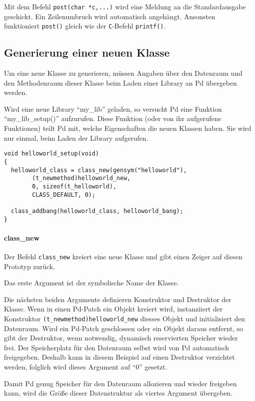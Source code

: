 \documentclass[12pt, a4paper,austrian, titlepage]{article}
\begin{document}
Mit dem Befehl \verb+post(char *c,...)+ wird eine Meldung an die Standardausgabe
geschickt.
Ein Zeilenumbruch wird automatisch angehängt.
Ansonsten funktioniert \verb+post()+ gleich wie der {\tt C}-Befehl \verb+printf()+.

\subsection{Generierung einer neuen Klasse}
Um eine neue Klasse zu generieren, müssen Angaben über
den Datenraum und den Methodenraum dieser Klasse 
beim Laden einer Library an Pd übergeben werden.

Wird eine neue Library ``my\_lib'' geladen,
so versucht Pd eine Funktion ``my\_lib\_setup()'' aufzurufen.
Diese Funktion (oder von ihr aufgerufene Funktionen) teilt Pd mit,
welche Eigenschaften die neuen Klassen haben.
Sie wird nur einmal, beim Laden der Library aufgerufen.

\begin{verbatim}
void helloworld_setup(void)
{
  helloworld_class = class_new(gensym("helloworld"),
        (t_newmethod)helloworld_new,
        0, sizeof(t_helloworld),
        CLASS_DEFAULT, 0);

  class_addbang(helloworld_class, helloworld_bang);
}
\end{verbatim}

\paragraph{class\_new}

Der Befehl \verb+class_new+ kreiert eine neue Klasse und gibt einen Zeiger auf diesen
Prototyp zurück.

Das erste Argument ist der symbolische Name der Klasse.

Die nächsten beiden Argumente definieren Konstruktor und Destruktor der Klasse.
Wenn in einen Pd-Patch ein Objekt kreiert wird, 
instanziiert der Konstruktor \verb+(t_newmethod)helloworld_new+ diesses Objekt
und initialisiert den Datenraum.
Wird ein Pd-Patch geschlossen oder ein Objekt daraus entfernt,
so gibt der Destruktor, wenn notwendig, dynamisch reservierten Speicher wieder frei.
Der Speicherplatz für den Datenraum selbst wird von Pd automatisch freigegeben.
Deshalb kann in diesem Beispiel auf einen Destruktor verzichtet werden,
folglich wird dieses Argument auf ``0'' gesetzt.

Damit Pd genug Speicher für den Datenraum allozieren und wieder freigeben kann,
wird die Größe dieser Datenstruktur als viertes Argument übergeben.
\end{document}
